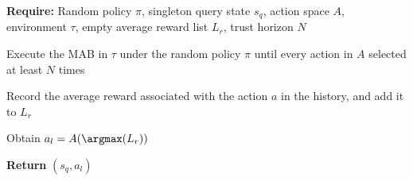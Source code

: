 \begin{algorithm}
\caption{Collecting Query States and Action Labels under Random Policy (MAB)}         \label{alg_collect_queries_bandit}
\begin{algorithmic}[1]
		\STATE \textbf{Require:} Random policy $\pi$, singleton query state $s_q$, action space $A$, environment $\tau$, empty average reward list $L_r$, trust horizon $N$
  
            \STATE Execute the MAB in $\tau$ under the random policy $\pi$ until every action in $A$ selected at least $N$ times

                \STATE Record the average reward associated with the action $a$ in the history, and add it to $L_r$
            

            \ENDFOR

            \STATE Obtain $a_l = A(\argmax (L_r))$

        \STATE \textbf{Return} $(s_q, a_l)$

\end{algorithmic}
\end{algorithm}









